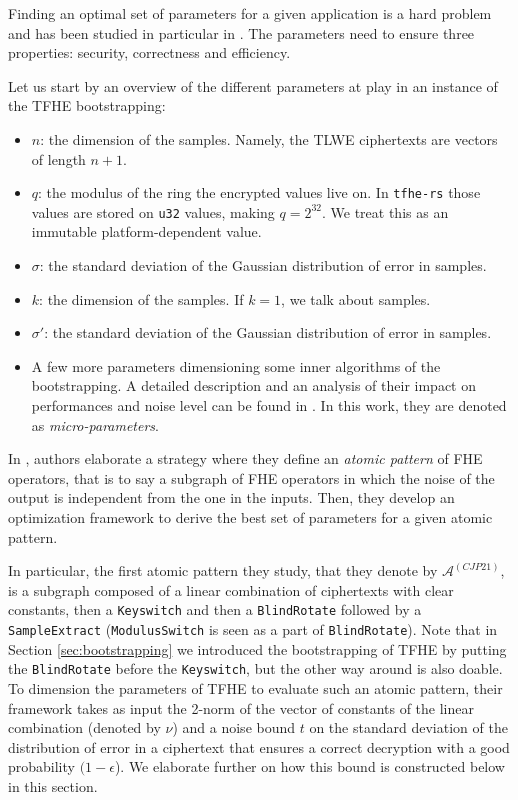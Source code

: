Finding an optimal set of parameters for a given application is a hard problem and has been studied in particular in \cite{zama_parameters_optimization}. The parameters need to ensure three properties: security, correctness and efficiency. 

Let us start by an overview of the different parameters at play in an instance of the TFHE bootstrapping:

\begin{itemize}
    \item $n$: the dimension of the \LWE samples. Namely, the TLWE ciphertexts are vectors of length $n + 1$.
    \item $q$: the modulus of the ring the encrypted values live on. In \texttt{tfhe-rs} those values are stored on \texttt{u32} values, making $q = 2^{32}$. We treat this as an immutable platform-dependent value.
    \item $\sigma$: the standard deviation of the Gaussian distribution of error in \LWE samples.
    \item $k$: the dimension of the \GLWE samples. If $k=1$, we talk about \RLWE samples.
    \item $\sigma'$: the standard deviation of the Gaussian distribution of error in \GLWE samples.
    \item A few more parameters dimensioning some inner algorithms of the bootstrapping. A detailed description and an analysis of their impact on performances and noise level can be found in \cite{zama_parameters_optimization}. In this work, they are denoted as \emph{micro-parameters}.
\end{itemize}

In \cite{zama_parameters_optimization}, authors elaborate a strategy where they define an \textit{atomic pattern} of FHE operators, that is to say a subgraph of FHE operators in which the noise of the output is independent from the one in the inputs. Then, they develop an optimization framework to derive the best set of parameters for a given atomic pattern.

In particular, the first atomic pattern they study, that they denote by $\mathcal{A}^{(CJP21)}$, is a subgraph composed of a linear combination of ciphertexts with clear constants, then a \texttt{Keyswitch} and then a \texttt{BlindRotate} followed by a \texttt{SampleExtract} (\texttt{ModulusSwitch} is seen as a part of \texttt{BlindRotate}). Note that in Section \ref{sec:bootstrapping} we introduced the bootstrapping of TFHE by putting the \texttt{BlindRotate} before the \texttt{Keyswitch}, but the other way around is also doable. To dimension the parameters of TFHE to evaluate such an atomic pattern, their framework takes as input the 2-norm of the vector of constants of the linear combination (denoted by $\nu$) and a noise bound $t$ on the standard deviation of the distribution of error in a ciphertext that ensures a correct decryption with a good probability $(1-\epsilon$). We elaborate further on how this bound is constructed below in this section.

